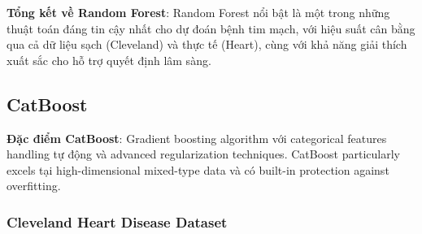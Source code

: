 \textbf{Tổng kết về Random Forest}: Random Forest nổi bật là một trong những thuật toán đáng tin cậy nhất cho dự đoán bệnh tim mạch, với hiệu suất cân bằng qua cả dữ liệu sạch (Cleveland) và thực tế (Heart), cùng với khả năng giải thích xuất sắc cho hỗ trợ quyết định lâm sàng.

\FloatBarrier

\subsection{CatBoost}\label{subsec:catboost}

\textbf{Đặc điểm CatBoost}: Gradient boosting algorithm với categorical features handling tự động và advanced regularization techniques. CatBoost particularly excels tại high-dimensional mixed-type data và có built-in protection against overfitting.

\subsubsection{Cleveland Heart Disease Dataset}\label{subsubsec:catboost-cleveland}

